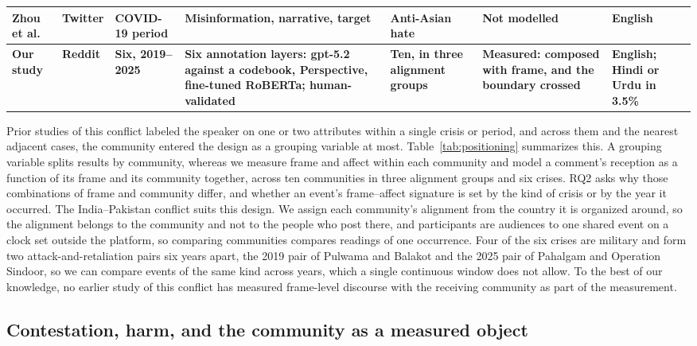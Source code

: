 \begin{table}[t]
\begin{tabularx}{\linewidth}{@{}Y{1.15}Y{0.70}Y{1.05}Y{1.30}Y{1.05}Y{1.03}Y{0.72}@{}}
Zhou et al.~\cite{zhou2025harm} & Twitter & COVID-19 period & Misinformation, narrative, target & Anti-Asian hate & Not modelled & English \\
\midrule
\textbf{Our study} & \textbf{Reddit} & \textbf{Six, 2019--2025} & \textbf{Six annotation layers: gpt-5.2 against a codebook, Perspective, fine-tuned RoBERTa; human-validated} & \textbf{Ten, in three alignment groups} & \textbf{Measured: composed with frame, and the boundary crossed} & \textbf{English; Hindi or Urdu in 3.5\%} \\
\bottomrule
\end{tabularx}
\end{table}

Prior studies of this conflict labeled the speaker on one or two attributes within a single crisis or period, and across them and the nearest adjacent cases, the community entered the design as a grouping variable at most. Table~\ref{tab:positioning} summarizes this. A grouping variable splits results by community, whereas we measure frame and affect within each community and model a comment's reception as a function of its frame and its community together, across ten communities in three alignment groups and six crises. RQ2 asks why those combinations of frame and community differ, and whether an event's frame--affect signature is set by the kind of crisis or by the year it occurred. The India--Pakistan conflict suits this design. We assign each community's alignment from the country it is organized around, so the alignment belongs to the community and not to the people who post there, and participants are audiences to one shared event on a clock set outside the platform, so comparing communities compares readings of one occurrence. Four of the six crises are military and form two attack-and-retaliation pairs six years apart, the 2019 pair of Pulwama and Balakot and the 2025 pair of Pahalgam and Operation Sindoor, so we can compare events of the same kind across years, which a single continuous window does not allow. To the best of our knowledge, no earlier study of this conflict has measured frame-level discourse with the receiving community as part of the measurement.



\subsection{Contestation, harm, and the community as a measured object}
\label{sec:rw-contestation}

